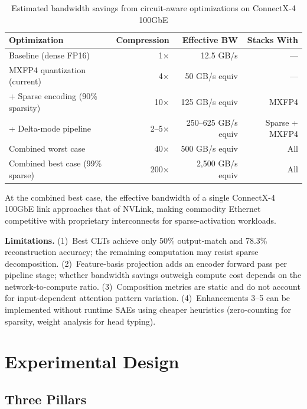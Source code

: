 \documentclass[11pt,letterpaper]{article}
\theoremstyle{definition}
\begin{document}
\begin{table}[htbp]
\centering
\caption{Estimated bandwidth savings from circuit-aware optimizations on ConnectX-4 100GbE}
\label{tab:circuit-impact}
\begin{tabular}{@{}lrrr@{}}
\toprule
\textbf{Optimization} & \textbf{Compression} & \textbf{Effective BW} & \textbf{Stacks With} \\
\midrule
Baseline (dense FP16) & 1$\times$ & 12.5 GB/s & --- \\
MXFP4 quantization (current) & 4$\times$ & 50 GB/s equiv & --- \\
+ Sparse encoding (90\% sparsity) & 10$\times$ & 125 GB/s equiv & MXFP4 \\
+ Delta-mode pipeline & 2--5$\times$ & 250--625 GB/s equiv & Sparse + MXFP4 \\
Combined worst case & 40$\times$ & 500 GB/s equiv & All \\
Combined best case (99\% sparse) & 200$\times$ & 2,500 GB/s equiv & All \\
\bottomrule
\end{tabular}
\end{table}

At the combined best case, the effective bandwidth of a single ConnectX-4 100GbE link approaches that of NVLink, making commodity Ethernet competitive with proprietary interconnects for sparse-activation workloads.

\textbf{Limitations.} (1)~Best CLTs achieve only 50\% output-match and 78.3\% reconstruction accuracy; the remaining computation may resist sparse decomposition. (2)~Feature-basis projection adds an encoder forward pass per pipeline stage; whether bandwidth savings outweigh compute cost depends on the network-to-compute ratio. (3)~Composition metrics are static and do not account for input-dependent attention pattern variation. (4)~Enhancements 3--5 can be implemented without runtime SAEs using cheaper heuristics (zero-counting for sparsity, weight analysis for head typing).

\section{Experimental Design}
\label{sec:experiments}

\subsection{Three Pillars}
\end{document}
